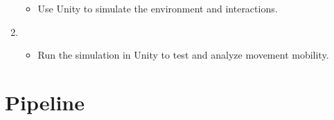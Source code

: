 \documentclass[letterpaper,10pt,english]{jupyterBook}
\begin{document}
\begin{enumerate}
\begin{itemize}
\item {} 
\sphinxAtStartPar
Use Unity to simulate the environment and interactions.

\end{itemize}

\item {} 
\sphinxAtStartPar
{}
\begin{itemize}
\item {} 
\sphinxAtStartPar
Run the simulation in Unity to test and analyze movement mobility.

\end{itemize}

\end{enumerate}

\sphinxstepscope


\chapter{Pipeline}
\label{\detokenize{Pipeline:pipeline}}\label{\detokenize{Pipeline::doc}}
\sphinxAtStartPar
{}
\end{document}
